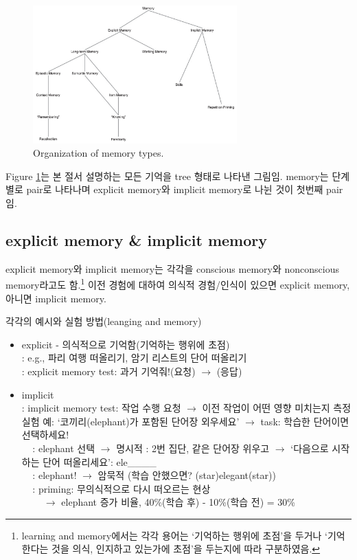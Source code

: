 \documentclass[../note.tex]{subfiles}
\begin{document}
\begin{figure}[h]
  \centering
  \includegraphics[width=0.7\textwidth]{image/memory_tree}
  \caption{Organization of memory types.}
  \label{fig:memory_tree}
\end{figure}

Figure \ref{fig:memory_tree}는 본 절서 설명하는 모든 기억을 tree 형태로 나타낸 그림임.
memory는 단계별로 pair로 나타나며 explicit memory와 implicit memory로 나뉜 것이 첫번째 pair임.

\subsection{explicit memory \& implicit memory}
explicit memory와 implicit memory는 각각을 conscious memory와 nonconscious memory라고도 함.\footnote{
  learning and memory에서는 각각 용어는 `기억하는 행위에 초점'을 두거나 `기억한다는 것을 의식, 인지하고 있는가에 초점'을 두는지에 따라 구분하였음.
}
이전 경험에 대하여 의식적 경험/인식이 있으면 explicit memory, 아니면 implicit memory.

\begin{example}각각의 예시와 실험 방법(leanging and memory)\\
  \begin{itemize}
    \item explicit - 의식적으로 기억함(기억하는 행위에 초점)\\
	: e.g., 파리 여행 떠올리기, 암기 리스트의 단어 떠올리기\\
	: explicit memory test: 과거 기억줘!(요청) $\rightarrow$ (응답)
    \item implicit\\
  : implicit memory test: 작업 수행 요청 $\rightarrow$ 이전 작업이 어떤 영향 미치는지 측정\\
  실험 예: `코끼리(elephant)가 포함된 단어장 외우세요' $\rightarrow$ task: 학습한 단어이면 선택하세요!\\
  $\;\;\;\;$: elephant 선택 $\rightarrow$ 명시적
	: 2번 집단, 같은 단어장 위우고 $\rightarrow$ `다음으로 시작하는 단어 떠올리세요': ele\_\_\_\_\\
  $\;\;\;\;$: elephant! $\rightarrow$ 암묵적 (학습 안했으면? (star)elegant(star))\\
  $\;\;\;\;$: priming: 무의식적으로 다시 떠오르는 현상\\
  $\;\;\;\;\;\;\;\;$$\rightarrow$ elephant 증가 비율, 40\%(학습 후) - 10\%(학습 전) = 30\%
  \end{itemize}
\end{example}
\end{document}
